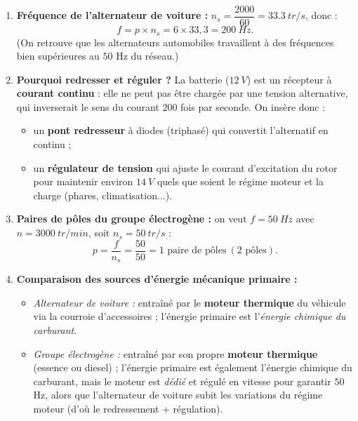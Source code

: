 \documentclass[11pt]{article}
\begin{document}
\begin{corrige}
\begin{enumerate}
\item \textbf{Fréquence de l'alternateur de voiture :} $n_s = \dfrac{2000}{60} = \SI{33,3}{tr/s}$, donc :
\[ f = p \times n_s = 6 \times 33,3 = \boxed{\SI{200}{Hz}}. \]
(On retrouve que les alternateurs automobiles travaillent à des fréquences bien supérieures au $50$ Hz du réseau.)

\item \textbf{Pourquoi redresser et réguler ?} La batterie ($\SI{12}{V}$) est un récepteur à \textbf{courant continu} : elle ne peut pas être chargée par une tension alternative, qui inverserait le sens du courant 200 fois par seconde. On insère donc :
\begin{itemize}
\item un \textbf{pont redresseur} à diodes (triphasé) qui convertit l'alternatif en continu ;
\item un \textbf{régulateur de tension} qui ajuste le courant d'excitation du rotor pour maintenir environ $\SI{14}{V}$ quels que soient le régime moteur et la charge (phares, climatisation...).
\end{itemize}

\item \textbf{Paires de pôles du groupe électrogène :} on veut $f = \SI{50}{Hz}$ avec $n = \SI{3000}{tr/min}$, soit $n_s = \SI{50}{tr/s}$ :
\[ p = \frac{f}{n_s} = \frac{50}{50} = \boxed{1 \text{ paire de pôles} \ (2 \text{ pôles})}. \]

\item \textbf{Comparaison des sources d'énergie mécanique primaire :}
\begin{itemize}
\item \emph{Alternateur de voiture :} entraîné par le \textbf{moteur thermique} du véhicule via la courroie d'accessoires ; l'énergie primaire est l'\emph{énergie chimique du carburant}.
\item \emph{Groupe électrogène :} entraîné par son propre \textbf{moteur thermique} (essence ou diesel) ; l'énergie primaire est également l'énergie chimique du carburant, mais le moteur est \emph{dédié} et régulé en vitesse pour garantir $50$ Hz, alors que l'alternateur de voiture subit les variations du régime moteur (d'où le redressement + régulation).
\end{itemize}
\end{enumerate}
\end{corrige}
\end{document}
